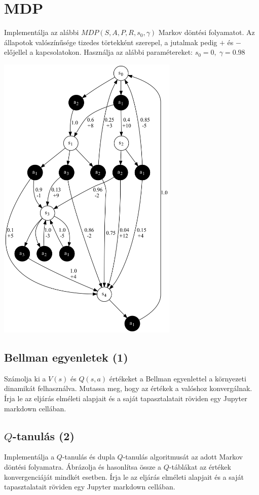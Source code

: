 \documentclass[english]{article}
\begin{document}
\newpage

\section{MDP}

Implementálja az alábbi $MDP(S,A,P,R,s_0,\gamma)$ Markov döntési folyamatot. Az állapotok valószínűsége tizedes törtekként szerepel, a jutalmak pedig $+$ és $-$ előjellel a kapcsolatokon. Használja az alábbi paramétereket: $s_0 = 0, \; \gamma=0.98$

\begin{center}
\includegraphics[width=\textwidth, height=14cm, keepaspectratio]{graphs/3_mdp.png}
\end{center}

\subsection{Bellman egyenletek (1)}
Számolja ki a $V(s)$ és $Q(s,a)$ értékeket a Bellman egyenlettel a környezeti dinamikát felhasználva. Mutassa meg, hogy az értékek a valóshoz konvergálnak. Írja le az eljárás elméleti alapjait és a saját tapasztalatait röviden egy Jupyter markdown cellában. 

\subsection{$Q$-tanulás (2)}
Implementálja a $Q$-tanulás és dupla $Q$-tanulás algoritmusát az adott Markov döntési folyamatra. Ábrázolja és hasonlítsa össze a $Q$-táblákat az értékek konvergenciáját mindkét esetben. Írja le az eljárás elméleti alapjait és a saját tapasztalatait röviden egy Jupyter markdown cellában.
\end{document}
